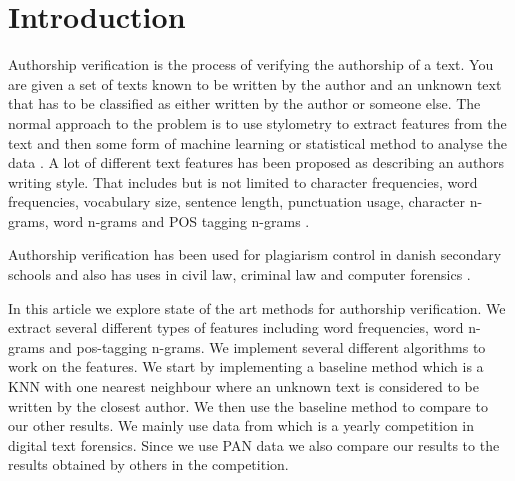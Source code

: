 \section{Introduction}
Authorship verification is the process of verifying the authorship of a text.
You are given a set of texts known to be written by the author and an unknown
text that has to be classified as either written by the author or someone else.
The normal approach to the problem is to use stylometry to extract features from
the text and then some form of machine learning or statistical method to analyse
the data \cite{stamatos2009}. A lot of different text features has been proposed
as describing an authors writing style. That includes but is not limited to
character frequencies, word frequencies, vocabulary size, sentence length,
punctuation usage, character n-grams, word n-grams and \gls{POS} tagging n-grams
\cite{stamatos2009}.

Authorship verification has been used for plagiarism control in danish secondary
schools \cite{hansen2014} and also has uses in civil law, criminal law and
computer forensics \cite{stamatos2009}.

In this article we explore state of the art methods for authorship verification.
We extract several different types of features including word frequencies, word
n-grams and pos-tagging n-grams. We implement several different algorithms to
work on the features. We start by implementing a baseline method which is a
\gls{KNN} with one nearest neighbour where an unknown text is considered to be
written by the closest author. We then use the baseline method to compare to
our other results. We mainly use data from \cite{pan:2015} which is a yearly
competition in digital text forensics. Since we use PAN data we also compare our
results to the results obtained by others in the competition.
